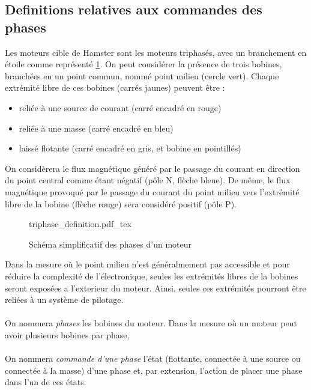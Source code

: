 \subsection{Definitions relatives aux commandes des phases}

Les moteurs cible de Hamster sont les moteurs triphasés, avec un branchement en étoile comme représenté \cref{fig-schema_phases_moteur}.
On peut considérer la présence de trois bobines, branchées en un point commun, nommé point milieu (cercle vert).
Chaque extrémité libre de ces bobines (carrés jaunes) peuvent être :
\begin{itemize}
    \item reliée à une source de courant (carré encadré en rouge)
    \item reliée à une masse (carré encadré en bleu)
    \item laissé flotante (carré encadré en gris, et bobine en pointillés)
\end{itemize}

On considèrera le flux magnétique généré par le passage du courant en direction du point central comme étant négatif (pôle N, flèche bleue).
De même, le flux magnétique provoqué par le passage du courant du point milieu vers l'extrémité libre de la bobine (flèche rouge) sera considéré positif (pôle P).

\begin{figure}[h]
    \centering
    {triphase_definition.pdf_tex}
    \caption{Schéma simplificatif des phases d'un moteur}
    \label{fig-schema_phases_moteur}
\end{figure}

Dans la mesure où le point milieu n'est généralmement pas accessible et pour réduire la complexité de l'électronique, seules les extrémités libres de la bobines seront exposées a l'exterieur du moteur.
Ainsi, seules ces extrémités pourront être reliées à un système de pilotage.

\paragraph{}
On nommera \emph{phases} les bobines du moteur. Dans la mesure où un moteur peut avoir plusieurs bobines par phase, 

\paragraph{}
On nommera \emph{commande d'une phase} l'état (flottante, connectée  à une source ou connectée à la masse) d'une phase et, par extension, l'action de placer une phase dans l'un de ces états.

